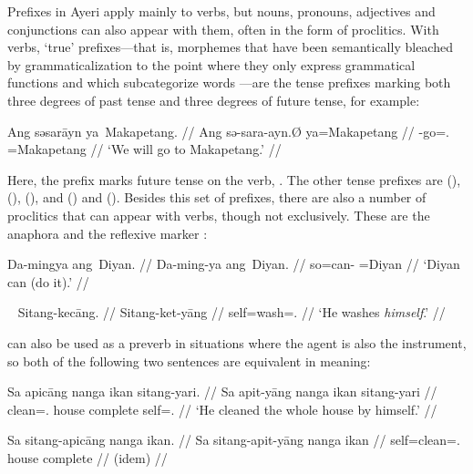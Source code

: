 Prefixes in Ayeri apply mainly to verbs, but nouns, pronouns, adjectives and 
conjunctions can also appear with them, often in the form of 
proclitics. With verbs, `true' prefixes---that is, morphemes that 
have been semantically bleached by grammaticalization to the point where they 
only express grammatical functions \citep[157ff.]{lehmann2015} and which 
subcategorize words \citep[117]{klavans1985}---are the tense prefixes marking 
both three degrees of past tense and three degrees of future tense, for example:

\ex\begingl
	\gla Ang səsarāyn ya~Makapetang. //
	\glb Ang sə-sara-ayn.Ø ya=Makapetang //
	\glc \AgtT{} \Fut{}-go=\Fpl{}.\Top{} \Loc{}=Makapetang //
	\glft `We will go to Makapetang.' //
\endgl\xe

Here, the prefix  marks future tense on the verb, 
. The other tense prefixes are  
(\NPst{}),  (\Pst{}),  (\RPst{}), and  
(\NFut{}) and  (\RFut{}). Besides this set of prefixes, there are 
also a number of proclitics that can appear with verbs, though not exclusively. 
These are the anaphora  and the 
reflexive marker :

\begin{multicols}{2}
\ex\begingl
	\gla Da-mingya ang~Diyan. //
	\glb Da-ming-ya ang~Diyan. //
	\glc so=can-\TsgM{} \Aarg{}=Diyan //
	\glft `Diyan can (do it).' //
\endgl
% 
\xe

\ex~\begingl
	\gla Sitang-kecāng. //
	\glb Sitang-ket-yāng //
	\glc self=wash=\TsgM{}.\Aarg{} //
	\glft `He washes \emph{himself}.' //
\endgl\xe
\end{multicols}

 can also be used as a preverb in situations where the 
agent is also the instrument, so both of the following two sentences are 
equivalent in meaning:

\pex
\a\label{ex:sitang+pronoun}\begingl
	\gla Sa apicāng nanga ikan sitang-yari. //
	\glb Sa apit-yāng nanga ikan sitang-yari //
	\glc \PatT{} clean=\Tsg{}.\Aarg{} house complete self=\TsgM{}.\Ins{} //
	\glft `He cleaned the whole house by himself.' //
\endgl

\a\begingl
	\gla Sa sitang-apicāng nanga ikan. //
	\glb Sa sitang-apit-yāng nanga ikan //
	\glc \PatT{} self=clean=\Tsg{}.\Aarg{} house complete //
	\glft (idem) //
\endgl
\xe

